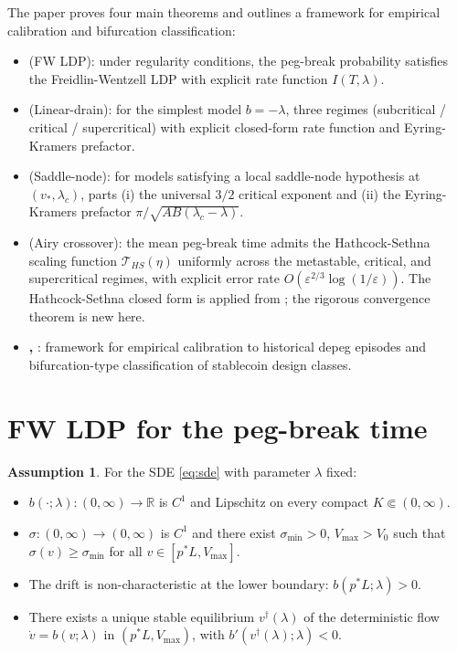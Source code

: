 \documentclass[11pt,a4paper]{article}
\theoremstyle{plain}
\theoremstyle{definition}
\newtheorem{assumption}[theorem]{Assumption}
\newcommand{\R}{\mathbb{R}}
\newcommand{\eps}{\varepsilon}
\begin{document}
The paper proves four main theorems and outlines a framework for empirical calibration and bifurcation classification:

\begin{itemize}
\item \textbf{} (FW LDP): under regularity conditions, the peg-break probability satisfies the Freidlin-Wentzell LDP with explicit rate function $I(T,\lambda)$.
\item \textbf{} (Linear-drain): for the simplest model $b = -\lambda$, three regimes (subcritical / critical / supercritical) with explicit closed-form rate function and Eyring-Kramers prefactor.
\item \textbf{} (Saddle-node): for models satisfying a local saddle-node hypothesis at $(v_*, \lambda_c)$, parts (i) the universal $3/2$ critical exponent and (ii) the Eyring-Kramers prefactor $\pi/\sqrt{AB(\lambda_c-\lambda)}$.
\item \textbf{} (Airy crossover): the mean peg-break time admits the Hathcock-Sethna scaling function $\mathcal T_{HS}(\eta)$ uniformly across the metastable, critical, and supercritical regimes, with explicit error rate $O(\eps^{2/3}\log(1/\eps))$. The Hathcock-Sethna closed form is applied from \cite{HathcockSethna2021}; the rigorous convergence theorem is new here.
\item \textbf{, }: framework for empirical calibration to historical depeg episodes and bifurcation-type classification of stablecoin design classes.
\end{itemize}

\section{FW LDP for the peg-break time}
\label{sec:LDP}

\begin{assumption}\label{assump:H1H4}
For the SDE \eqref{eq:sde} with parameter $\lambda$ fixed:
\begin{itemize}
\item[(H1)] $b(\cdot;\lambda) : (0,\infty) \to \R$ is $C^1$ and Lipschitz on every compact $K \Subset (0,\infty)$.
\item[(H2)] $\sigma : (0,\infty) \to (0,\infty)$ is $C^1$ and there exist $\sigma_{\min} > 0$, $V_{\max} > V_0$ such that $\sigma(v) \geq \sigma_{\min}$ for all $v \in [p^*L, V_{\max}]$.
\item[(H3)] The drift is non-characteristic at the lower boundary: $b(p^*L;\lambda) > 0$.
\item[(H4)] There exists a unique stable equilibrium $v^\dagger(\lambda)$ of the deterministic flow $\dot v = b(v;\lambda)$ in $(p^*L, V_{\max})$, with $b'(v^\dagger(\lambda);\lambda) < 0$.
\end{itemize}
\end{assumption}
\end{document}
